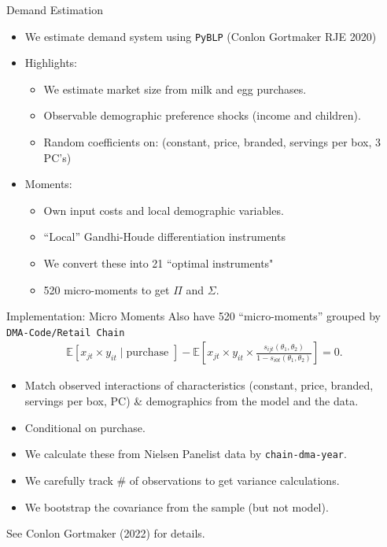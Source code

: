 \documentclass[handout,aspectratio=169,10pt]{beamer}
\begin{document}
\begin{frame}[plain,label=maindemand]{Demand Estimation}
\begin{itemize}
\item We estimate demand system using \texttt{PyBLP} (Conlon Gortmaker RJE 2020)
\item Highlights:
\begin{itemize}
\item We estimate market size from milk and egg purchases.
\item Observable demographic preference shocks (income and children).
\item Random coefficients on: (constant, price, branded, servings per box, 3 PC's)
\end{itemize}
\item Moments:
\begin{itemize}
\item Own input costs and local demographic variables.
\item ``Local'' Gandhi-Houde differentiation instruments
\item We convert these into 21 ``optimal instruments"
\item 520 micro-moments to get $\Pi$ and $\Sigma$.
\end{itemize}
\end{itemize}
\end{frame}


\begin{frame}{Implementation: Micro Moments}
Also have 520 ``micro-moments'' grouped by \texttt{DMA-Code/Retail Chain}
\begin{align*}
\mathbb{E} \left[x_{jt} \times y_{it} \mid \text{purchase } \right] 
- \mathbb{E}\left[x_{jt} \times y_{it}  \times \frac{s_{ijt}(\theta_1,\theta_2)}{1-s_{i0t}(\theta_1,\theta_2)}  \right] = 0.
\end{align*}
\begin{itemize}
\item Match observed interactions of characteristics (constant, price, branded, servings per box, PC) \& demographics from the model and the data.
\item Conditional on purchase.
\item We calculate these from Nielsen Panelist data by \texttt{chain-dma-year}.
\item We carefully track \# of observations to get variance calculations.
\item We bootstrap the covariance from the sample (but not model).
\end{itemize}
See Conlon Gortmaker (2022) for details.
\end{frame}
\end{document}
